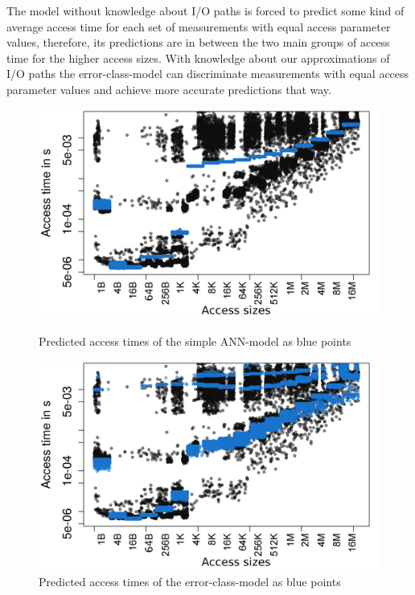 \documentclass{superfri}
\begin{document}
	The model without knowledge about I/O paths is forced to predict some kind of average access time for each set of measurements with equal access parameter values, therefore, its predictions are in between the two main groups of access time for the higher access sizes.
	With knowledge about our approximations of I/O paths the error-class-model can discriminate measurements with equal access parameter values and achieve more accurate predictions that way.
	\begin{figure}[h]
		\centering
		\begin{minipage}[b]{0.47\textwidth}
			\includegraphics[width=\textwidth]{src/plot_onlyPred_tuple1_Duration_rnd.png}
			\caption{Predicted access times of the simple ANN-model as blue points}
			\label{pred_tuple1}
		\end{minipage}
		\hfill
		\begin{minipage}[b]{0.47\textwidth}
			\includegraphics[width=\textwidth]{src/plot_onlyPred_tuple1_with_error_class_from_linreg_Duration_rnd.png}
			\caption{Predicted access times of the error-class-model as blue points}
			\label{pred_error}
		\end{minipage}
	\end{figure}
	
\end{document}
